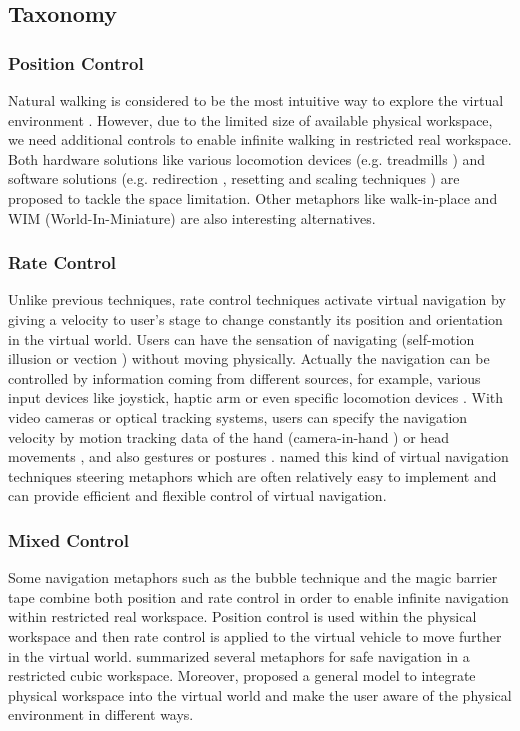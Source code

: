 \subsection{Taxonomy}
\subsubsection{Position Control}
Natural walking is considered to be the most intuitive way to explore the virtual environment \citep{Ruddle2009BW}. However, due to the limited size of available physical workspace, we need additional controls to enable infinite walking in restricted real workspace. Both hardware solutions like various locomotion devices (e.g. treadmills \citep{Iwata1999Treadmill}) and software solutions (e.g. redirection \citep{Peck2008RED}, resetting \citep{Williams2007ELV} and scaling techniques \citep{Interrante2007SLB}) are proposed to tackle the space limitation. Other metaphors like walk-in-place \citep{Razzaque2002RWP} and WIM (World-In-Miniature) \citep{Stoakley1995VRW} are also interesting alternatives.

\subsubsection{Rate Control}
Unlike previous techniques, rate control techniques activate virtual navigation by giving a velocity to user's stage to change constantly its position and orientation in the virtual world. Users can have the sensation of navigating (self-motion illusion or vection \citep{Riecke2012Vection}) without moving physically. Actually the navigation can be controlled by information coming from different sources, for example, various input devices like joystick, haptic arm \citep{Martin2012Forklift} or even specific locomotion devices \citep{Marchal2011JOYMAN}. With video cameras or optical tracking systems, users can specify the navigation velocity by motion tracking data of the hand (camera-in-hand \citep{Ware1990EVC}) or head movements \citep{Bourdot2002HCNav}, and also gestures \citep{Konrad2003Gesture} or postures \citep{Kapri2011Steering}. \citet{Bowman2004UIT} named this kind of virtual navigation techniques steering metaphors which are often relatively easy to implement and can provide efficient and flexible control of virtual navigation.

\subsubsection{Mixed Control}
Some navigation metaphors such as the bubble technique \citep{Dominjon2005Bubble} and the magic barrier tape \citep{Cirio2009MBT} combine both position and rate control in order to enable infinite navigation within restricted real workspace. Position control is used within the physical workspace and then rate control is applied to the virtual vehicle to move further in the virtual world. \citet{Cirio2012Cube} summarized several metaphors for safe navigation in a restricted cubic workspace. Moreover, \citet{Fleury2010Generic} proposed a general model to integrate physical workspace into the virtual world and make the user aware of the physical environment in different ways.


